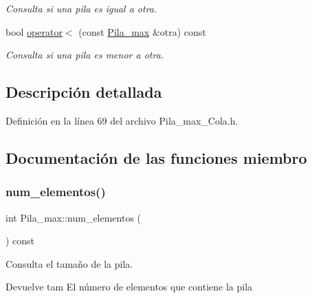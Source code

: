 \begin{DoxyCompactItemize}
\begin{DoxyCompactList}\small\item\em Consulta si una pila es igual a otra. \end{DoxyCompactList}\item 
bool \hyperlink{classPila__max_a95b52785eaa96cebe08b6b000953c1ac}{operator$<$} (const \hyperlink{classPila__max}{Pila\+\_\+max} \&otra) const
\begin{DoxyCompactList}\small\item\em Consulta si una pila es menor a otra. \end{DoxyCompactList}\end{DoxyCompactItemize}


\subsection{Descripción detallada}


Definición en la línea 69 del archivo Pila\+\_\+max\+\_\+\+Cola.\+h.



\subsection{Documentación de las funciones miembro}
\mbox{\label{classPila__max_a693ba4373cac8db4d820ff6c76d6d8da}} 
\subsubsection{\texorpdfstring{num\+\_\+elementos()}{num\_elementos()}\hspace{0.1cm}{\footnotesize\ttfamily [1/2]}}
{\footnotesize\ttfamily int Pila\+\_\+max\+::num\+\_\+elementos (\begin{DoxyParamCaption}{ }\end{DoxyParamCaption}) const}



Consulta el tamaño de la pila. 

\begin{DoxyReturn}{Devuelve}
tam El número de elementos que contiene la pila 
\end{DoxyReturn}
\mbox{\label{classPila__max_a693ba4373cac8db4d820ff6c76d6d8da}} 
